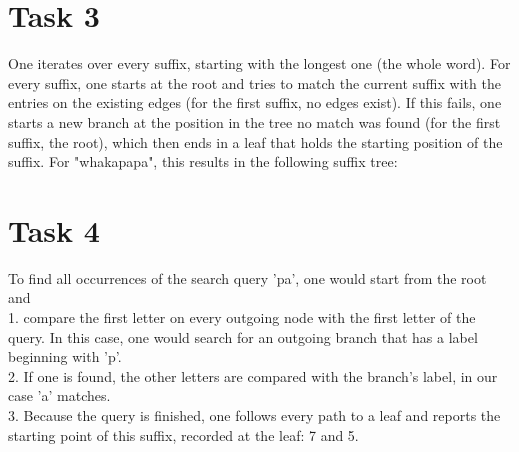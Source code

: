 \documentclass[10pt,a4paper]{article}
\begin{document}
	\section*{Task 3}
		One iterates over every suffix, starting with the longest one (the whole word). For every suffix, one starts at the root and tries to match the current suffix with the entries on the existing edges (for the first suffix, no edges exist). If this fails, one starts a new branch at the position in the tree no match was found (for the first suffix, the root), which then ends in a leaf that holds the starting position of the suffix. For "whakapapa", this results in the following suffix tree:\\
	\section*{Task 4}
		To find all occurrences of the search query 'pa', one would start from the root and\\
		1. compare the first letter on every outgoing node with the first letter of the query. In this case, one would search for an outgoing branch that has a label beginning with 'p'.\\
		2. If one is found, the other letters are compared with the branch's label, in our case 'a' matches.\\
		3. Because the query is finished, one follows every path to a leaf and reports the starting point of this suffix, recorded at the leaf: 7 and 5.
\end{document}
